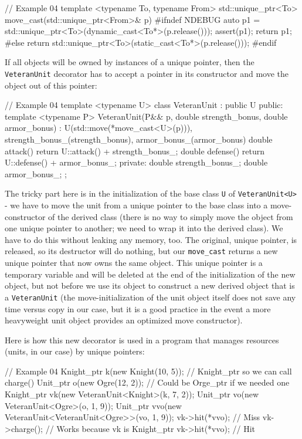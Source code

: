 \begin{code}
// Example 04
template <typename To, typename From>
std::unique_ptr<To> move_cast(std::unique_ptr<From>& p) {
#ifndef NDEBUG
 auto p1 =
   std::unique_ptr<To>(dynamic_cast<To*>(p.release()));
 assert(p1);
 return p1;
#else
 return std::unique_ptr<To>(static_cast<To*>(p.release()));
#endif
}
\end{code}

If all objects will be owned by instances of a unique pointer, then the \texttt{VeteranUnit} decorator has to accept a pointer in its constructor and move the object out of this pointer:

\begin{code}
// Example 04
template <typename U> class VeteranUnit : public U {
  public:
  template <typename P>
  VeteranUnit(P&& p,
              double strength_bonus,
              double armor_bonus) :
    U(std::move(*move_cast<U>(p))),
    strength_bonus_(strength_bonus),
    armor_bonus_(armor_bonus) {}
  double attack() { return U::attack() + strength_bonus_; }
  double defense() { return U::defense() + armor_bonus_; }
  private:
  double strength_bonus_;
  double armor_bonus_;
};
\end{code}

The tricky part here is in the initialization of the base class \texttt{U} of \texttt{VeteranUnit\textless{}U\textgreater{}} - we have to move the unit from a unique pointer to the base class into a move-constructor of the derived class (there is no way to simply move the object from one unique pointer to another; we need to wrap it into the derived class). We have to do this without leaking any memory, too. The original, unique pointer, is released, so its destructor will do nothing, but our \texttt{move\_cast} returns a new unique pointer that now owns the same object. This unique pointer is a temporary variable and will be deleted at the end of the initialization of the new object, but not before we use its object to construct a new derived object that is a \texttt{VeteranUnit} (the move-initialization of the unit object itself does not save any time versus copy in our case, but it is a good practice in the event a more heavyweight unit object provides an optimized move constructor).

Here is how this new decorator is used in a program that manages resources (units, in our case) by unique pointers:

\begin{code}
// Example 04
Knight_ptr k(new Knight(10, 5));
  // Knight_ptr so we can call charge()
Unit_ptr o(new Ogre(12, 2));
  // Could be Orge_ptr if we needed one
Knight_ptr vk(new VeteranUnit<Knight>(k, 7, 2));
Unit_ptr vo(new VeteranUnit<Ogre>(o, 1, 9));
Unit_ptr vvo(new VeteranUnit<VeteranUnit<Ogre>>(vo, 1, 9));
vk->hit(*vvo); // Miss
vk->charge(); // Works because vk is Knight_ptr
vk->hit(*vvo); // Hit
\end{code}

